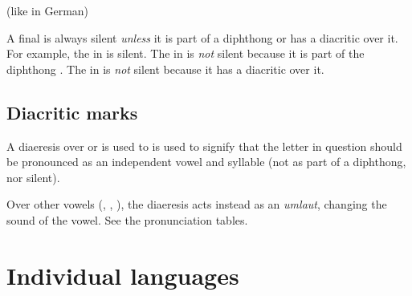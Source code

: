 \begin{pronunciationenvironment}{}
   (like in German)
\end{pronunciationenvironment}

A final  is always silent \emph{unless} it is part of a diphthong or has a diacritic over it. 
For example, the  in \pex{\scathaese} is silent.
The  in \pex{\scathae} is \emph{not} silent because it is part of the diphthong .
The  in \pex{\Samure} is \emph{not} silent because it has a diacritic over it.









\subsection{Diacritic marks}
A diaeresis over  or  is used to is used to signify that the letter in question should be pronounced as an independent vowel and syllable (not as part of a diphthong, nor silent). 

Over other vowels (, , ), the diaeresis acts instead as an \emph{umlaut}, changing the sound of the vowel. 
See the pronunciation tables. 















\section{Individual languages}









